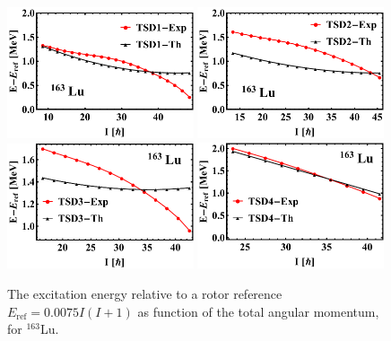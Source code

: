 \begin{figure}
    \centering
    \includegraphics[width=0.49\textwidth]{Chapters/Figures/Lu-exp-energies/fig12a_lu163.pdf}
    \includegraphics[width=0.49\textwidth]{Chapters/Figures/Lu-exp-energies/fig12b_lu163.pdf}
    \includegraphics[width=0.49\textwidth]{Chapters/Figures/Lu-exp-energies/fig12c_lu163.pdf}
    \includegraphics[width=0.49\textwidth]{Chapters/Figures/Lu-exp-energies/fig12d_lu163.pdf}
    \caption{The excitation energy relative to a rotor reference $E_\text{ref}=0.0075I(I+1)$ as function of the total angular momentum, for $^{163}$Lu.}
    \label{reference-rotor-energy-lu163}
\end{figure}

